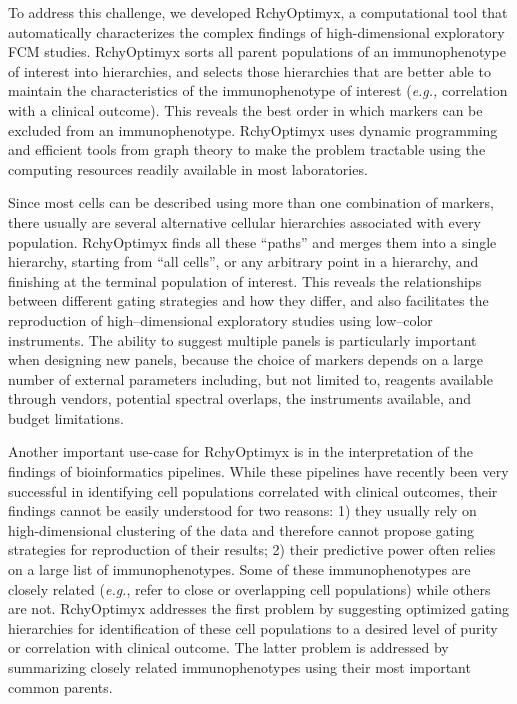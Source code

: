 To address this challenge, we  developed RchyOptimyx, a computational tool that automatically characterizes the complex findings of high-dimensional exploratory FCM studies.
RchyOptimyx sorts all parent populations of an immunophenotype of interest into hierarchies, and selects those hierarchies that are better able to maintain the characteristics of the immunophenotype of interest (\emph{e.g.,} correlation with a clinical outcome).
This reveals the best order in which markers can be excluded from an immunophenotype.
RchyOptimyx uses dynamic programming and efficient tools from graph theory to make the problem tractable using the computing resources readily available in most laboratories. 

Since most cells can be described using more than one combination of markers, there usually are several alternative cellular hierarchies associated with every population.
RchyOptimyx finds all these ``paths'' and merges them into a single hierarchy, starting from ``all cells'', or any arbitrary point in a hierarchy,  and finishing at the terminal population of interest.
This reveals the relationships between different gating strategies and how they differ, and also facilitates the reproduction of high--dimensional exploratory studies using low--color instruments.
The ability to suggest multiple panels is particularly important when designing new panels, because the choice of markers depends on a large number of external parameters including, but not limited to, reagents available through vendors, potential spectral overlaps, the instruments available, and budget limitations.


Another important use-case for RchyOptimyx is in the  interpretation of the findings of bioinformatics pipelines.
While these pipelines have recently been very successful in identifying cell populations correlated with clinical outcomes, their findings cannot be easily understood for two reasons: 1) they usually rely on high-dimensional clustering of the data and therefore cannot propose gating strategies for reproduction of their results; 2) their predictive power often relies on a large list of immunophenotypes. 
Some of these immunophenotypes are closely related (\emph{e.g.}, refer to close or overlapping cell populations) while others are not. 
RchyOptimyx addresses the first problem by suggesting optimized gating hierarchies for identification of these cell populations to a desired level of purity or correlation with clinical outcome. 
The latter problem is addressed by summarizing closely related immunophenotypes using their most important common parents.

